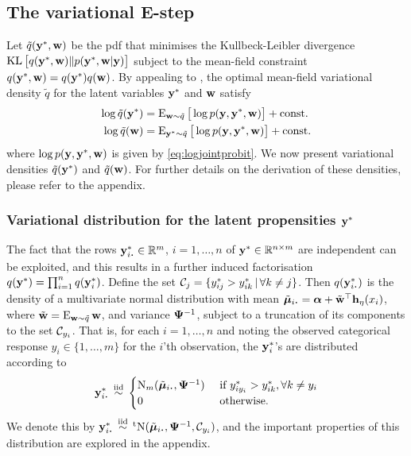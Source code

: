 \subsection{The variational E-step}

Let $\tilde q({\mathbf y}^*,{\mathbf w})$ be the pdf that minimises the Kullbeck-Leibler divergence $\operatorname{KL}\big[ q({\mathbf y}^*,{\mathbf w}) \Vert p({\mathbf y}^*,{\mathbf w}|{\mathbf y}) \big]$ subject to the mean-field constraint $q({\mathbf y}^*,{\mathbf w}) = q({\mathbf y}^*)q({\mathbf w})$.
By appealing to \citet[equation 10.9, p. 466]{bishop2006pattern}, the optimal mean-field variational density $\tilde q$ for the latent variables ${\mathbf y}^*$ and ${\mathbf w}$ satisfy
\begin{align}
  \log \tilde q({\mathbf y}^*) &= \operatorname{E}_{{\mathbf w}\sim\tilde q} \big[ \log p({\mathbf y},{\mathbf y}^*,{\mathbf w}) \big] + \text{const.}\hspace{0.01em} \\
  \log \tilde q({\mathbf w}) &= \operatorname{E}_{{\mathbf y}^*\sim\tilde q} \big[ \log p({\mathbf y},{\mathbf y}^*,{\mathbf w}) \big] + \text{const.}\hspace{0.01em} 
\end{align}
where $\log p({\mathbf y},{\mathbf y}^*,{\mathbf w})$ is given by \cref{eq:logjointprobit}.
We now present variational densities $\tilde q({\mathbf y}^*)$ and $\tilde q({\mathbf w})$.
For further details on the derivation of these densities, please refer to the appendix.

\subsubsection{Variational distribution for the latent propensities \texorpdfstring{${\mathbf y}^*$}{$y^*$}}

The fact that the rows $\by_{i \bigcdot}^* \in \bbR^m$, $i=1,\dots,n$ of ${\mathbf y}^* \in \mathbb{R}^{n \times m}$ are independent can be exploited, and this results in a further induced factorisation $q({\mathbf y}^*) = \prod_{i=1}^n q({\mathbf y}_i^*)$.
Define the set ${\mathcal C}_j = \{y_{ij}^* > y_{ik}^* \,|\, \forall k\neq j \}$.
Then $q(\by_{i \bigcdot}^*)$ is the density of a multivariate normal distribution with mean $\tilde \bmu_{i \bigcdot} = \balpha + \tilde\bw^\top  \bh_\eta(x_i)$, where $\tilde {{\mathbf w}} = \operatorname{E}_{{\mathbf w}\sim\tilde q}{\mathbf w}$, and variance ${\bm\Psi}^{-1}$, subject to a truncation of its components to the set ${\mathcal C}_{y_i}$.
That is, for each $i=1,\dots,n$ and noting the observed categorical response $y_i \in \{1,\dots,m\}$ for the $i$'th observation, the ${\mathbf y}_i^*$'s are distributed according to
\begin{align}\label{eq:ystardist}
  \by_{i \bigcdot}^* \iid
  \begin{cases}
    \N_m(\tilde\bmu_{i \bigcdot},  \bPsi^{-1}) & \text{ if } y_{iy_i}^* > y_{ik}^*, \forall k \neq y_i \\
    0 & \text{ otherwise}. \\
  \end{cases}
\end{align}
We denote this by $\by_{i \bigcdot}^* \iid \tN(\tilde\bmu_{i \bigcdot}, \bPsi^{-1},\cC_{y_i})$, and the important properties of this distribution are explored in the appendix.

